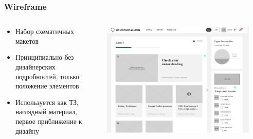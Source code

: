 \documentclass[xetex,mathserif,serif]{beamer}
\begin{document}
		\begin{frame}
			\frametitle{Wireframe}
			\begin{columns}
				\begin{column}{0.4\textwidth}
					\begin{itemize}
						\item Набор схематичных макетов
						\item Принципиально без дизайнерских подробностей, только положение элементов
						\item Используется как ТЗ, наглядный материал, первое приближение к дизайну
					\end{itemize}
				\end{column}
				\begin{column}{0.6\textwidth}
					\begin{center}
						\includegraphics[width=\textwidth]{wireframe.png}
					\end{center}
				\end{column}
			\end{columns}
		\end{frame}
	
\end{document}
